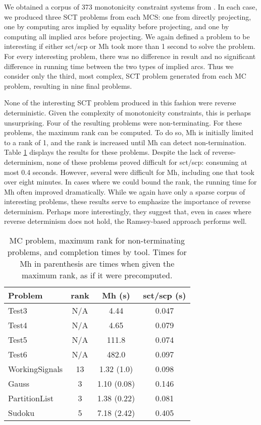 \documentclass{LMCS}
\begin{document}
We obtained a corpus of 373 monotonicity constraint systems from
\cite{CGBFG11}. In each case, we produced three SCT problems from each MCS: one from directly projecting, one by computing arcs implied by
equality before projecting, and one by computing all implied arcs before
projecting. We again defined a problem to be interesting if either sct/scp or
Mh took more than 1 second to solve the problem. For every interesting problem,
there was no difference in result and no significant difference in running time
between the two types of implied arcs. Thus we consider only the third, most
complex, SCT problem generated from each MC problem, resulting in nine final
problems.

None of the interesting SCT problem produced in this fashion were reverse
deterministic. Given the complexity of monotonicity constraints, this is
perhaps unsurprising. Four of the resulting problems were non-terminating.
For these problems, the maximum rank can be computed. To do so, Mh is initially limited to a rank of
1, and the rank is increased until Mh can detect non-termination.  Table \ref{Table:MC_Completion}
displays the results for these problems. Despite the lack of reverse-determinism, none of these
problems proved difficult for sct/scp: consuming at most 0.4 seconds. However, several were
difficult for Mh, including one that took over eight minutes. In cases where we could bound the
rank, the running time for Mh often improved dramatically. While we again have only a sparse corpus
of interesting problems, these results serve to emphasize the importance of reverse determinism.
Perhaps more interestingly, they suggest that, even in cases where reverse determinism does not
hold, the Ramsey-based approach performs well.


\begin{table}[!htp]
\centering
\begin{tabular}{|l|c|c|c|}
\hline Problem & rank & Mh (s) & sct/scp (s) \\
\hline Test3 & N/A & 4.44 & 0.047 \\
\hline Test4 & N/A & 4.65 & 0.079 \\
\hline Test5 & N/A & 111.8 & 0.074 \\
\hline Test6 & N/A & 482.0 & 0.097 \\
\hline WorkingSignals & 13 & 1.32 (1.0) & 0.098 \\
\hline Gauss & 3 & 1.10 (0.08) & 0.146 \\
\hline PartitionList & 3 & 1.38 (0.22) & 0.081 \\
\hline Sudoku & 5 & 7.18 (2.42) & 0.405 \\
\hline
\end{tabular}
\vspace{0.05in}
\caption{MC problem, maximum rank for non-terminating problems, and completion times by tool. Times
for Mh in parenthesis are times when given the maximum rank, as if it were precomputed.}\label{Table:MC_Completion}
\end{table}
\end{document}
